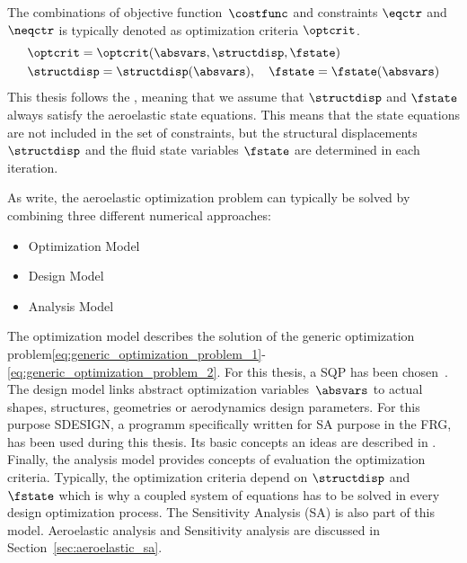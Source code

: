 \documentclass[../main.tex]{subfiles}
\begin{document}
The combinations of objective function~$\costfunc$ and constraints $\eqctr$ and $\neqctr$ is typically denoted as optimization criteria $\optcrit$.
\begin{align}\label{eq:optimization_criteria}
&\optcrit=\optcrit(\absvars,\structdisp,\fstate) \nonumber \\
&\structdisp=\structdisp(\absvars),~~~\fstate=\fstate(\absvars)
\end{align}
This thesis follows the , meaning that we assume that $\structdisp$ and $\fstate$ always satisfy the aeroelastic state equations. This means that the state equations are not included in the set of constraints, but the structural displacements $\structdisp$ and the fluid state variables $\fstate$ are determined in each iteration.

As \cite{Maute2001} write, the aeroelastic optimization problem can typically be solved by combining three different numerical approaches:
\begin{itemize}
\item Optimization Model
\item Design Model
\item Analysis Model
\end{itemize}

The optimization model describes the solution of the generic optimization problem\eqref{eq:generic_optimization_problem_1}-\eqref{eq:generic_optimization_problem_2}. For this thesis, a \ac{SQP} has been chosen~\cite{Bonnans2006}.\\
The design model links abstract optimization variables~$\absvars$ to actual shapes, structures, geometries or aerodynamics design parameters. For this purpose SDESIGN, a programm specifically written for \ac{SA} purpose in the \ac{FRG}, has been used during this thesis. Its basic concepts an ideas are described in \cite{Maute2003}.\\
Finally, the analysis model provides concepts of evaluation the optimization criteria. Typically, the optimization criteria depend on $\structdisp$ and $\fstate$ which is why a coupled system of equations has to be solved in every design optimization process. The Sensitivity Analysis (SA) is also part of this model. Aeroelastic analysis and Sensitivity analysis are discussed in Section~\ref{sec:aeroelastic_sa}.
\end{document}
